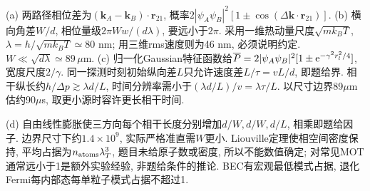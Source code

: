 \begin{solution}(a) 两路径相位差为$(\mathbf k_A-\mathbf k_B)\cdot\mathbf r_{21}$, 概率$2|\psi_A\psi_B|^2[1\pm\cos(\Delta\mathbf k\cdot\mathbf r_{21})]$. (b) 横向角差$W/d$, 相位量级$2\pi Ww/(d\lambda)$, 要远小于$2\pi$. 采用一维热动量尺度$\sqrt{mk_BT}$,$\lambda=h/\sqrt{mk_BT}\simeq80$ nm; 用三维rms速度则为46 nm, 必须说明约定. $W\ll\sqrt{d\lambda}\simeq89\,\mu$m. (c) 归一化Gaussian特征函数给$\overline P=2|\psi_A\psi_B|^2[1\pm\mathrm e^{-\gamma^2r_l^2/4}]$, 宽度尺度$2/\gamma$. 同一探测时刻初始纵向差$L$只允许速度差$L/\tau=vL/d$, 即题给界. 相干纵长约$h/\Delta p\gtrsim\lambda d/L$, 时间分辨率需小于$(\lambda d/L)/v=\lambda\tau/L$. 以尺寸边界89$\mu$m估约90$\mu$s, 取更小源时容许更长相干时间.

(d) 自由线性膨胀使三方向每个相干长度分别增加$d/W,d/W,d/L$, 相乘即题给因子. 边界尺寸下约$1.4\times10^9$, 实际严格准直需$W$更小. Liouville定理使相空间密度保持, 平均占据为$n_{\rm atoms}\lambda_T^3$, 题目未给原子数或密度, 所以不能数值确定; 对常见MOT通常远小于1是额外实验经验, 非题给条件的推论. BEC有宏观最低模式占据, 退化Fermi每内部态每单粒子模式占据不超过1.
\end{solution}
